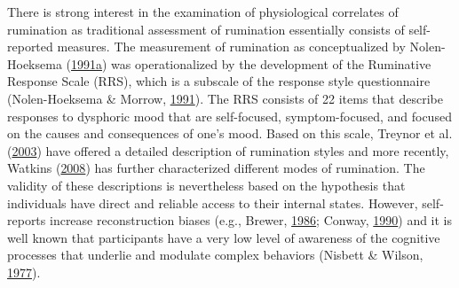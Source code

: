 \documentclass[a4paper,12pt,twoside,openright,oldfontcommands]{memoir}
\begin{document}
There is strong interest in the examination of physiological correlates of rumination as traditional assessment of rumination essentially consists of self-reported measures. The measurement of rumination as conceptualized by Nolen-Hoeksema (\protect\hyperlink{ref-nolen-hoeksema_responses_1991}{1991}\protect\hyperlink{ref-nolen-hoeksema_responses_1991}{a}) was operationalized by the development of the Ruminative Response Scale (RRS), which is a subscale of the response style questionnaire (Nolen-Hoeksema \& Morrow, \protect\hyperlink{ref-nolen-hoeksema_prospective_1991}{1991}). The RRS consists of 22 items that describe responses to dysphoric mood that are self-focused, symptom-focused, and focused on the causes and consequences of one's mood. Based on this scale, Treynor et al. (\protect\hyperlink{ref-treynor_rumination_2003}{2003}) have offered a detailed description of rumination styles and more recently, Watkins (\protect\hyperlink{ref-Watkins2008}{2008}) has further characterized different modes of rumination. The validity of these descriptions is nevertheless based on the hypothesis that individuals have direct and reliable access to their internal states. However, self-reports increase reconstruction biases (e.g., Brewer, \protect\hyperlink{ref-rubin_what_1986}{1986}; Conway, \protect\hyperlink{ref-conway_autobiographical_1990}{1990}) and it is well known that participants have a very low level of awareness of the cognitive processes that underlie and modulate complex behaviors (Nisbett \& Wilson, \protect\hyperlink{ref-nisbett_telling_1977}{1977}).
\end{document}
